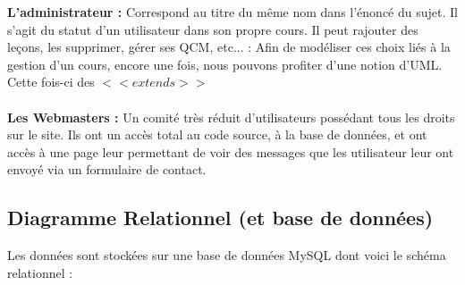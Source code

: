 \documentclass[a4paper,10pt]{article}
\begin{document}
\textbf{L'administrateur :} Correspond au titre du même nom dans l'énoncé du sujet. Il s'agit du statut d'un utilisateur dans son propre cours. Il peut rajouter des leçons, les supprimer, gérer ses QCM, etc... :  Afin de modéliser ces choix liés à la gestion d'un cours, encore une fois, nous pouvons profiter d'une notion d'UML. Cette fois-ci des $<<extends>>$ \\\\

\textbf{Les Webmasters :} Un comité très réduit d'utilisateurs possédant tous les droits sur le site. Ils ont un accès total au code source, à la base de données, et ont accès à une page leur permettant de voir des messages que les utilisateur leur ont envoyé via un formulaire de contact.
\newpage
\subsection{Diagramme Relationnel (et base de données)}

Les données sont stockées sur une base de données MySQL dont voici le schéma relationnel : \\\\
\end{document}
